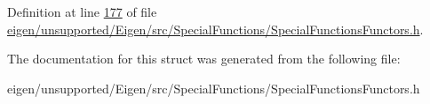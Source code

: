 Definition at line \hyperlink{eigen_2unsupported_2_eigen_2src_2_special_functions_2_special_functions_functors_8h_source_l00177}{177} of file \hyperlink{eigen_2unsupported_2_eigen_2src_2_special_functions_2_special_functions_functors_8h_source}{eigen/unsupported/\+Eigen/src/\+Special\+Functions/\+Special\+Functions\+Functors.\+h}.



The documentation for this struct was generated from the following file\+:\begin{DoxyCompactItemize}
\item 
eigen/unsupported/\+Eigen/src/\+Special\+Functions/\+Special\+Functions\+Functors.\+h\end{DoxyCompactItemize}
